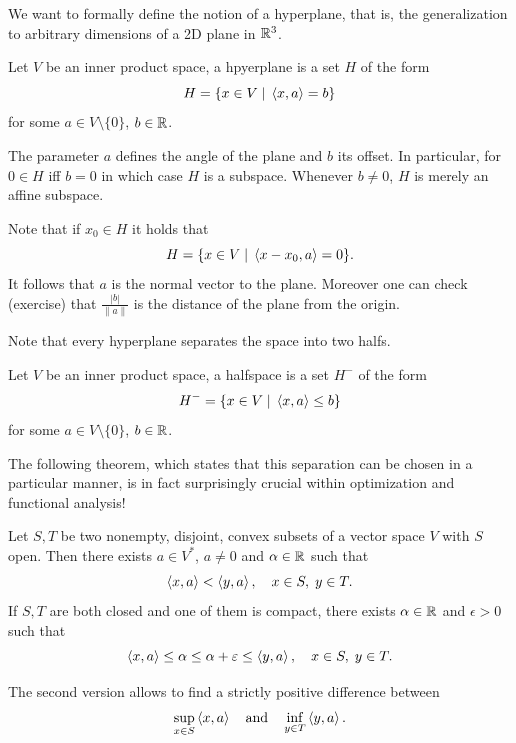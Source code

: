 We want to formally define the notion of a hyperplane, that is, the generalization to arbitrary dimensions of a 2D plane in $\mathbb{R}^3$.

\begin{defn}[Hyperplanes]
    Let $V$ be an inner product space, a hpyerplane is a set $H$ of the form
    \begin{equation}
        H = \{x\in V\;|\; \left\langle x , a\right\rangle=b\}
    \end{equation}
    for some $a\in V\setminus\{0\}$, $b\in\mathbb{R}$.
\end{defn}

The parameter $a$ defines the angle of the plane and $b$ its offset. In particular, for $0\in H$ iff $b=0$ in which case $H$ is a subspace. Whenever $b\neq 0$, $H$ is merely an affine subspace.

Note that if $x_0\in H$ it holds that
\begin{equation}
    H = \{x\in V\;|\; \left\langle x-x_0 , a\right\rangle=0\}.
\end{equation}
It follows that $a$ is the normal vector to the plane. Moreover one can check (exercise) that $\frac{|b|}{\|a\|}$ is the distance of the plane from the origin.

Note that every hyperplane separates the space into two halfs. 
\begin{defn}[Halfspaces]
    Let $V$ be an inner product space, a halfspace is a set $H^-$ of the form
    \begin{equation}
        H^- = \{x\in V\;|\; \left\langle x , a\right\rangle\leq b\}
    \end{equation}
    for some $a\in V\setminus\{0\}$, $b\in\mathbb{R}$.
\end{defn}

The following theorem, which states that this separation can be chosen in a particular manner, is in fact surprisingly crucial within optimization and functional analysis!

\begin{theorem}
    Let $S,T$ be two nonempty, disjoint, convex subsets of a vector space $V$ with $S$ open. Then there exists $a\in V^*$, $a\neq 0$ and $\alpha\in \mathbb{R}$ such that
    \begin{equation}
        \left\langle x , a\right\rangle<\left\langle y , a\right\rangle,\quad x\in S, \; y\in T.
    \end{equation}
    If $S,T$ are both closed and one of them is compact, there exists $\alpha\in \mathbb{R}$ and $\epsilon>0$ such that 
    \begin{equation}
        \left\langle x , a\right\rangle\leq \alpha\leq \alpha+\varepsilon\leq \left\langle y , a\right\rangle,\quad x\in S, \; y\in T.
    \end{equation}
\end{theorem}
The second version allows to find a strictly positive difference between 
\[
    \sup_{x\in S}\left\langle x , a\right\rangle
    \quad 
    \text{and}
    \quad
    \inf_{y\in T}\left\langle y , a\right\rangle.
\]


